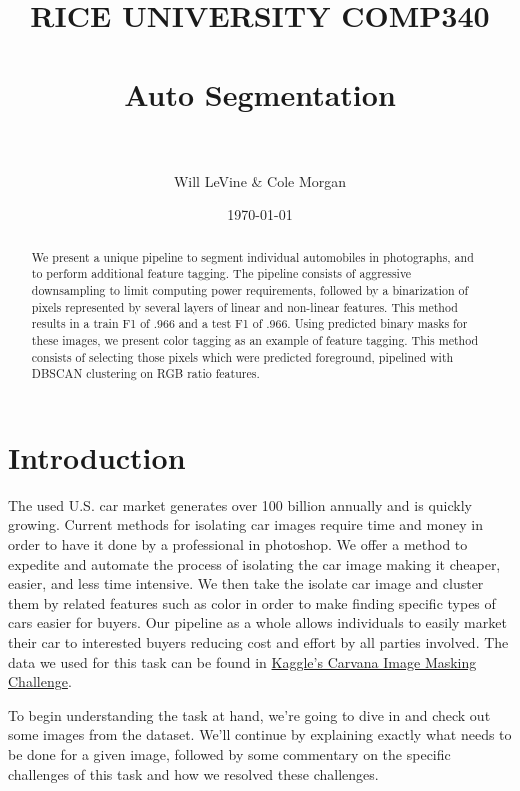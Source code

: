 \documentclass[paper=letter, fontsize=12pt]{article}
\title{
\normalfont \normalsize
\textsc{RICE UNIVERSITY COMP340} \\ [25pt]
\horrule{0.5pt} \\[0.4cm] %
\huge Auto Segmentation \\ %
\horrule{2pt} \\[0.5cm] %
}
\author{Will LeVine \& Cole Morgan}
\date{\normalsize\today}
\numberwithin{equation}{section} %
\numberwithin{figure}{section} %
\numberwithin{table}{section} %
\begin{document}
\maketitle

\begin{abstract}
    We present a unique pipeline to segment individual automobiles in
    photographs, and to perform additional feature tagging.  The pipeline
    consists of aggressive downsampling to limit computing power requirements,
    followed by a binarization of pixels represented by several layers of linear
    and non-linear features. This method results in a train F1 of .966 and a
    test F1 of .966. Using predicted binary masks for these images, we present
    color tagging as an example of feature tagging. This method consists of
    selecting those pixels which were predicted foreground, pipelined with
    DBSCAN clustering on RGB ratio features.
\end{abstract}

\newpage

\tableofcontents

\newpage



\section{Introduction}

The used U.S. car market generates over 100 billion annually and is quickly growing.
Current methods for isolating car images require time and money in order to have it
done by a professional in photoshop. We offer a method to expedite and automate the
process of isolating the car image making it cheaper, easier, and less time intensive.
We then take the isolate car image and cluster them by related features such as color
in order to make finding specific types of cars easier for buyers. Our pipeline as a
whole allows individuals to easily market their car to interested buyers reducing
cost and effort by all parties involved. The data we used for this task can be found
in
\href{https://www.kaggle.com/c/carvana-image-masking-challenge/data}{Kaggle's Carvana Image Masking Challenge}.

To begin understanding the task at hand, we're going to dive in and check out
some images from the dataset.  We'll continue by explaining exactly what needs
to be done for a given image, followed by some commentary on the specific
challenges of this task and how we resolved these challenges.
\end{document}
